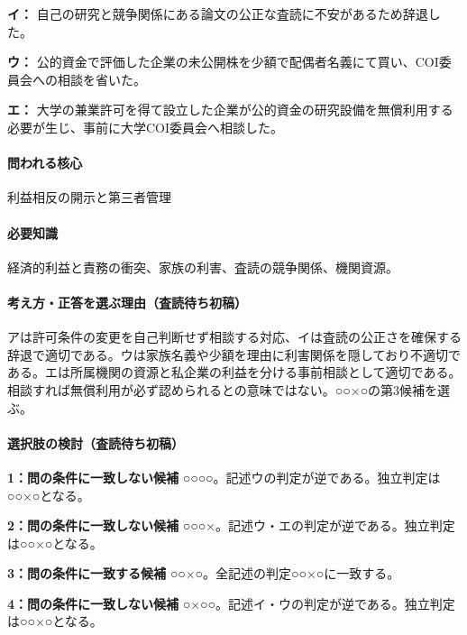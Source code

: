 \noindent\textbf{イ：} 自己の研究と競争関係にある論文の公正な査読に不安があるため辞退した。\par

\noindent\textbf{ウ：} 公的資金で評価した企業の未公開株を少額で配偶者名義にて買い、COI委員会への相談を省いた。\par

\noindent\textbf{エ：} 大学の兼業許可を得て設立した企業が公的資金の研究設備を無償利用する必要が生じ、事前に大学COI委員会へ相談した。\par

\paragraph{問われる核心} 利益相反の開示と第三者管理

\paragraph{必要知識} 経済的利益と責務の衝突、家族の利害、査読の競争関係、機関資源。

\paragraph{考え方・正答を選ぶ理由（査読待ち初稿）} アは許可条件の変更を自己判断せず相談する対応、イは査読の公正さを確保する辞退で適切である。ウは家族名義や少額を理由に利害関係を隠しており不適切である。エは所属機関の資源と私企業の利益を分ける事前相談として適切である。相談すれば無償利用が必ず認められるとの意味ではない。○○×○の第3候補を選ぶ。

\paragraph{選択肢の検討（査読待ち初稿）}\mbox{}\par

\noindent\textbf{1：問の条件に一致しない候補} ○○○○。記述ウの判定が逆である。独立判定は○○×○となる。\par

\noindent\textbf{2：問の条件に一致しない候補} ○○○×。記述ウ・エの判定が逆である。独立判定は○○×○となる。\par

\noindent\textbf{3：問の条件に一致する候補} ○○×○。全記述の判定○○×○に一致する。\par

\noindent\textbf{4：問の条件に一致しない候補} ○×○○。記述イ・ウの判定が逆である。独立判定は○○×○となる。\par


